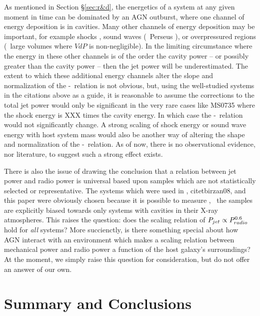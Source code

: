 \documentclass{emulateapj}
\begin{document}
As mentioned in Section \S\ref{sec:r&d}, the energetics of a system at
any given moment in time can be dominated by an AGN outburst, where
one channel of energy deposition is in cavities. Many other channels
of energy deposition may be important, for example shocks
\citep{ms0735, hydraa, herca, 2005ApJ...635..894F,
  2006MNRAS.371L..65S}, sound waves (\eg\ Perseus \citep{perseus3}),
or overpressured regions (\eg\ large volumes where $V dP$ is
non-negligible). In the limiting circumstance where the energy in
these other channels is of the order the cavity power -- or possibly
greater than the cavity power \citep{2006MNRAS.373..739N} -- then the
jet power will be underestimated. The extent to which these additional
energy channels alter the slope and normalization of the
\pcav-\prad\ relation is not obvious, but, using the well-studied
systems in the citations above as a guide, it is reasonable to assume
the corrections to the total jet power would only be significant in
the very rare cases like MS0735 where the shock energy is XXX times
the cavity energy. In which case the \pcav-\prad\ relation would not
significantly change. A strong scaling of shock energy or sound wave
energy with host system mass would also be another way of altering the
shape and normalization of the \pcav-\prad\ relation. As of now, there
is no observational evidence, nor literature, to suggest such a strong
effect exists.

There is also the issue of drawing the conclusion that a relation
between jet power and radio power is universal based upon samples
which are not statistically selected or representative. The systems
which were used in \citet{birzan04}, citet{birzan08}, and this paper
were obviously chosen because it is possible to measure \pcav,
\eg\ the samples are explicitly biased towards only systems with
cavities in their X-ray atmospheres. This raises the question: does
the scaling relation of $P_{jet} \propto P_{radio}^{0.6}$ hold for
{\it{all}} systems? More succienctly, is there something special about
how AGN interact with an environment which makes a scaling relation
between mechanical power and radio power a function of the host
galaxy's surroundings? At the moment, we simply raise this question
for consideration, but do not offer an answer of our own.

\section{Summary and Conclusions}
\label{sec:summary}
\end{document}
